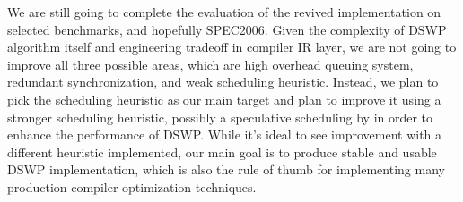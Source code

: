 \documentclass[letterpaper, 10 pt, conference]{ieeeconf}  %
\begin{document}
We are still going to complete the evaluation of the revived implementation on selected benchmarks, and hopefully SPEC2006. Given the complexity of DSWP algorithm itself and engineering tradeoff in compiler IR layer, we are not going to improve all three possible areas, which are high overhead queuing system, redundant synchronization, and weak scheduling heuristic. Instead, we plan to pick the scheduling heuristic as our main target and plan to improve it using a stronger scheduling heuristic, possibly a speculative scheduling by \cite{c5} in order to enhance the performance of DSWP. While it's ideal to see improvement with a different heuristic implemented, our main goal is to produce stable and usable DSWP implementation, which is also the rule of thumb for implementing many production compiler optimization techniques. 





 

\end{document}
